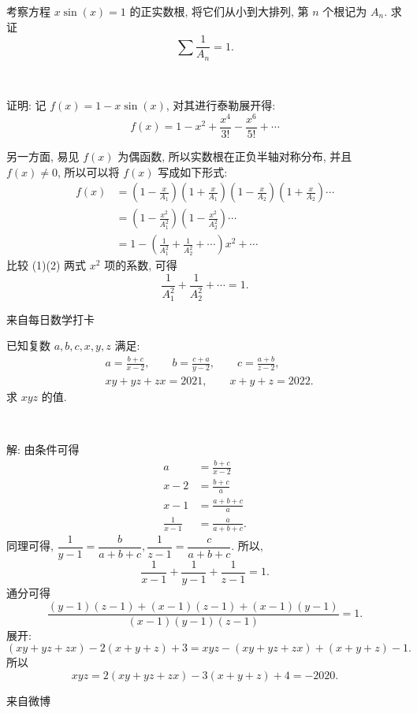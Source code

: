 \newpage
考察方程 $x\sin(x)=1$ 的正实数根, 将它们从小到大排列, 第 $n$ 个根记为 $A_n$. 求证
\[\sum \frac{1}{A_n} = 1 .\]

~

证明: 记 $f(x) = 1 - x\sin(x)$, 对其进行泰勒展开得:
\[ f(x) = 1 - x^2 + \frac{x^4}{3!} - \frac{x^6}{5!} + \cdots \tag{1} \]

另一方面, 易见 $f(x)$ 为偶函数, 所以实数根在正负半轴对称分布, 并且 $f(x)\neq 0$, 所以可以将 $f(x)$ 写成如下形式:
\begin{align*}
f(x) &= \left(1-\frac{x}{A_1}\right)\left(1+\frac{x}{A_1}\right)\left(1-\frac{x}{A_2}\right)\left(1+\frac{x}{A_2}\right)\cdots \\
&= \left(1-\frac{x^2}{A_1^2}\right)\left(1-\frac{x^2}{A_2^2}\right)\cdots \\
&= 1 - \left( \frac{1}{A_1^2}+\frac{1}{A_2^2} + \cdots \right)x^2 + \cdots \tag{2}
\end{align*}
比较 (1)(2) 两式 $x^2$ 项的系数, 可得
\[\frac{1}{A_1^2}+\frac{1}{A_2^2} + \cdots = 1 .\]

\newpage
\noindent 来自每日数学打卡

已知复数 $a,b,c,x,y,z$ 满足:
\begin{align*}
& a = \frac{b+c}{x-2}, \qquad b = \frac{c+a}{y-2},\qquad c = \frac{a+b}{z-2},\\
& xy+yz+zx = 2021,\qquad x+y+z=2022.
\end{align*}
求 $xyz$ 的值.

~

解: 由条件可得
\begin{align*}
a &= \frac{b+c}{x-2}\\
x-2 &= \frac{b+c}{a}\\
x-1 &= \frac{a+b+c}{a}\\
\frac{1}{x-1} &= \frac{a}{a+b+c}.
\end{align*}
同理可得, $\dfrac{1}{y-1} = \dfrac{b}{a+b+c}, \dfrac{1}{z-1} = \dfrac{c}{a+b+c}$.
所以, 
\[\frac{1}{x-1} + \frac{1}{y-1}+\frac{1}{z-1} = 1.\]
通分可得
\[\frac{(y-1)(z-1)+(x-1)(z-1)+(x-1)(y-1)}{(x-1)(y-1)(z-1)} = 1.\]
展开:
\[ (xy + yz + zx) - 2(x+y+z) + 3 = xyz - (xy+yz+zx) + (x+y+z) - 1.\]
所以
\[xyz = 2(xy+yz+zx) - 3(x+y+z) + 4 = -2020.\]

\newpage
\noindent 来自微博

